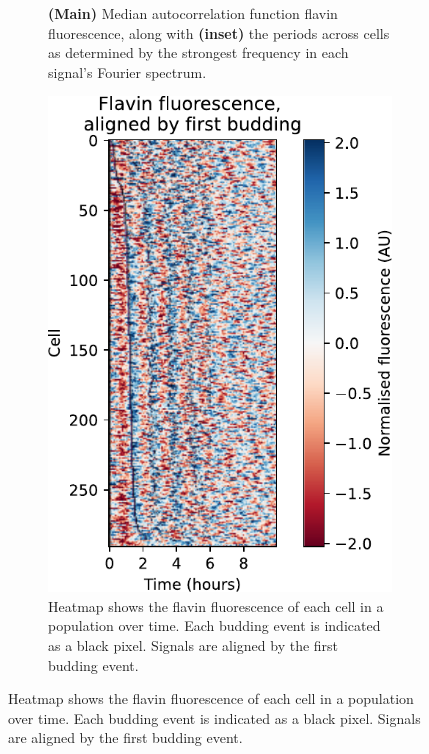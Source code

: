 \begin{figure}
\begin{subfigure}[htpb]{0.4\textwidth}
   \caption{
     \textbf{(Main)} Median autocorrelation function flavin fluorescence, %
     along with \textbf{(inset)} the periods across cells as determined by the strongest frequency in each signal's Fourier spectrum.
   }
   \label{fig:biology-by4741-sync-acf}
  \end{subfigure}

  \begin{subfigure}[htpb]{0.4\textwidth}
   \centering
   \includegraphics[width=\textwidth]{by4741_491_7.pdf}
   \caption{
    Heatmap shows the flavin fluorescence of each cell in a population over time.
    Each budding event is indicated as a black pixel.
    Signals are aligned by the first budding event.
   }
   \label{fig:biology-by4741-sync-heatmap}

\end{subfigure}
\end{figure}
